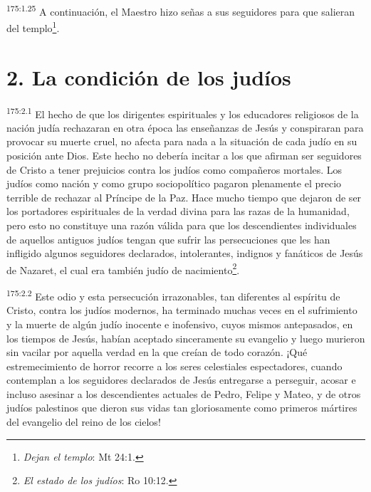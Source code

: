\par
\textsuperscript{175:1.25} A continuación, el Maestro hizo señas a sus seguidores para que salieran del templo\footnote{\textit{Dejan el templo}: Mt 24:1.}.

\section*{2. La condición de los judíos}
\par
\textsuperscript{175:2.1} El hecho de que los dirigentes espirituales y los educadores religiosos de la nación judía rechazaran en otra época las enseñanzas de Jesús y conspiraran para provocar su muerte cruel, no afecta para nada a la situación de cada judío en su posición ante Dios. Este hecho no debería incitar a los que afirman ser seguidores de Cristo a tener prejuicios contra los judíos como compañeros mortales. Los judíos como nación y como grupo sociopolítico pagaron plenamente el precio terrible de rechazar al Príncipe de la Paz. Hace mucho tiempo que dejaron de ser los portadores espirituales de la verdad divina para las razas de la humanidad, pero esto no constituye una razón válida para que los descendientes individuales de aquellos antiguos judíos tengan que sufrir las persecuciones que les han infligido algunos seguidores declarados, intolerantes, indignos y fanáticos de Jesús de Nazaret, el cual era también judío de nacimiento\footnote{\textit{El estado de los judíos}: Ro 10:12.}.

\par
\textsuperscript{175:2.2} Este odio y esta persecución irrazonables, tan diferentes al espíritu de Cristo, contra los judíos modernos, ha terminado muchas veces en el sufrimiento y la muerte de algún judío inocente e inofensivo, cuyos mismos antepasados, en los tiempos de Jesús, habían aceptado sinceramente su evangelio y luego murieron sin vacilar por aquella verdad en la que creían de todo corazón. ¡Qué estremecimiento de horror recorre a los seres celestiales espectadores, cuando contemplan a los seguidores declarados de Jesús entregarse a perseguir, acosar e incluso asesinar a los descendientes actuales de Pedro, Felipe y Mateo, y de otros judíos palestinos que dieron sus vidas tan gloriosamente como primeros mártires del evangelio del reino de los cielos!

